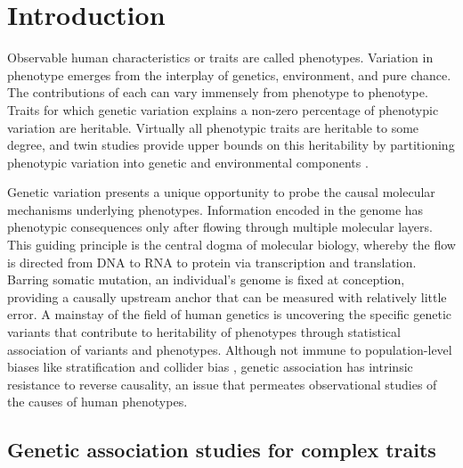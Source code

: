%
%

\chapter{Introduction}
\label{ch:introduction}

Observable human characteristics or traits are called phenotypes.
Variation in phenotype emerges from the interplay of genetics, environment, and pure chance.
The contributions of each can vary immensely from phenotype to phenotype.
Traits for which genetic variation explains a non-zero percentage of phenotypic variation are heritable.
Virtually all phenotypic traits are heritable to some degree, 
and twin studies provide upper bounds on this heritability by partitioning phenotypic variation into genetic and environmental components \autocite{polderman2015MetaanalysisHeritabilityHuman}.

Genetic variation presents a unique opportunity to probe the causal molecular mechanisms underlying phenotypes.
Information encoded in the genome has phenotypic consequences only after flowing through multiple molecular layers.
This guiding principle is the central dogma of molecular biology, whereby the flow is directed from DNA to RNA to protein via transcription and translation.
Barring somatic mutation, an individual's genome is fixed at conception, providing a causally upstream anchor that can be measured with relatively little error.
A mainstay of the field of human genetics is uncovering the specific genetic variants that contribute to heritability of phenotypes through statistical association of variants and phenotypes.
Although not immune to population-level biases like stratification \autocite{lawson2020PopulationStructureGenetic} and collider bias \autocite{day2016RobustExampleCollider},
genetic association has intrinsic resistance to reverse causality, an issue that permeates observational studies of the causes of human phenotypes.

\section{Genetic association studies for complex traits}

